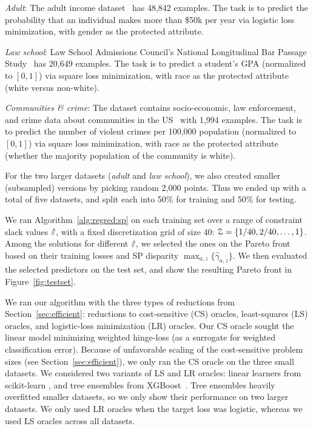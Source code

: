 \documentclass{article}
\begin{document}
\emph{Adult}: The adult income dataset~\cite{Lichman:2013}
  has 48,842 examples. The task is to predict the probability that
  an individual makes more than \$50k per year via logistic
  loss minimization, with gender as the protected attribute.

\emph{Law school}: Law School Admissions Council’s National
  Longitudinal Bar Passage Study~\cite{Wightman} has 20,649
  examples. The task is to predict a student’s GPA (normalized
  to $[0,1]$) via square loss minimization, with race as
  the protected attribute (white versus non-white).

\emph{Communities \& crime}: The dataset contains
  socio-economic, law enforcement, and crime data about
  communities in the US~\cite{communities} with 1,994 examples. The
  task is to predict the number of violent crimes per 100,000
  population (normalized to $[0, 1]$) via square loss
  minimization, with race as the protected attribute (whether the
  majority population of the community is white).

For the two larger datasets (\emph{adult} and \emph{law school}), we also
created smaller (subsampled) versions by picking random 2,000 points. Thus we ended up
with a total of five
datasets, and split each into 50\% for training and 50\% for testing.

We ran Algorithm~\ref{alg:regred:sp} on each
training set over a range of constraint slack values
$\hat {\varepsilon}$, with a fixed discretization grid of size 40:
$\mathcal{Z}=\{1/40, 2/40, \ldots, 1\}$. Among the solutions for different $\hat{\varepsilon}$,
we selected the ones on the Pareto front based on their training losses
and SP disparity $\max_{a,z}\{\hat \gamma_{a, z}\}$. We
then evaluated the selected predictors on the test set, and show the resulting Pareto front
in Figure~\ref{fig:testset}.
%

We ran our algorithm with the three types of
reductions from Section~\ref{sec:efficient}: reductions to cost-sensitive
(CS) oracles, least-squares
(LS) oracles, and logistic-loss minimization (LR) oracles.
Our CS oracle sought the linear model minimizing
weighted hinge-loss (as a surrogate for weighted classification error).
%
%
Because of unfavorable scaling
of the cost-sensitive problem sizes (see Section~\ref{sec:efficient}),
we only ran the CS oracle on the three small datasets.
We considered two variants of LS and LR oracles: linear learners from
scikit-learn \citep{scikit-learn}, and tree ensembles from XGBoost~\cite{xgb}.
Tree ensembles heavily overfitted smaller datasets, so we only show their performance
on two larger datasets. We only used LR oracles when the target loss was logistic,
whereas we used LS oracles across all datasets.
%
\end{document}
